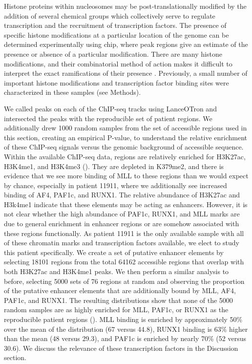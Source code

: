 Histone proteins within nucleosomes may be post-translationally modified by the addition of several chemical groups which collectively serve to regulate transcription and the recruitment of transcription factors. The presence of specific histone modifications at a particular location of the genome can be determined experimentally using \gls{chip}, where peak regions give an estimate of the presence or absence of a particular modification. There are many histone modifications, and their combinatorial method of action makes it difficult to interpret the exact ramifications of their presence \cite{T2001}. Previously, a small number of important histone modifications and transcription factor binding sites were characterized in these samples (see Methods).  

We called peaks on each of the ChIP-seq tracks using LanceOTron and intersected the peaks with the reproducible set of patient regions. We additionally drew 1000 random samples from the set of accessible regions used in this section, creating an empirical P-value, to understand the relative enrichment of these ChIP-seq signals versus the genomic background of accessible sequence. Within the available ChIP-seq data, regions are relatively enriched for H3K27ac, H3K4me1, and H3K4me3 (). They are depleted in K379me2, and there is evidence that we see more binding of MLL to these regions than we would expect by chance, especially in patient 11911, where we additionally see increased binding of AF4, PAF1c, and RUNX1. The relative abundance of H3K27ac and H3k4me1 indicate that these elements may be acting as enhancers. However, it is not clear whether the high abundance of PAF1c, RUNX1, and MLL marks are due to general enrichment in enhancer regions or are somehow associated with these regions functionally. As patient 11911 is the only available sample with all of these chromatin marks and transcription factors available, we elect to study this patient specifically. We create a set of putative enhancer elements by selecting 18101 regions from the total 64162 accessible regions that overlap with both H3K27ac and H3K4me1 peaks. We then perform a similar analysis to before, selecting 5000 sets of 76 regions at random and observing the proportion of the putative enhancer elements that are additionally bound by MLL, AF4, PAF1c, and RUNX1. The resulting distributions show that none of the 5000 random samples are as highly enriched for MLL, PAF1c, or RUNX1 as the reproducible patient regions (). MLL binding is enriched by approximately 50\% over the mean of the distribution (67 versus 44.8), RUNX1 binding is 63\% higher than the mean (48 versus 29.3), and PAF1c is enriched by nearly 70\% (52 versus 30.6). We discuss the relevance of these transcription factors in the Discussion section. 

